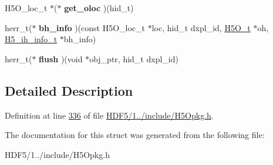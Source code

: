 \begin{DoxyCompactItemize}
\mbox{\label{struct_h5_o__obj__class__t_a9003688d6bd85086846ba1a469f45981}} 
H5\+O\+\_\+loc\+\_\+t $\ast$($\ast$ {\bfseries get\+\_\+oloc} )(hid\+\_\+t)
\item 
\mbox{\label{struct_h5_o__obj__class__t_a7deca9359b5540c8de4cc66cf4ea6350}} 
herr\+\_\+t($\ast$ {\bfseries bh\+\_\+info} )(const H5\+O\+\_\+loc\+\_\+t $\ast$loc, hid\+\_\+t dxpl\+\_\+id, \hyperlink{struct_h5_o__t}{H5\+O\+\_\+t} $\ast$oh, \hyperlink{struct_h5__ih__info__t}{H5\+\_\+ih\+\_\+info\+\_\+t} $\ast$bh\+\_\+info)
\item 
\mbox{\label{struct_h5_o__obj__class__t_af05ff60e0aec800c4a545b642e04c31a}} 
herr\+\_\+t($\ast$ {\bfseries flush} )(void $\ast$obj\+\_\+ptr, hid\+\_\+t dxpl\+\_\+id)
\end{DoxyCompactItemize}


\subsection{Detailed Description}


Definition at line \hyperlink{_h_d_f5_21_810_81_2include_2_h5_opkg_8h_source_l00336}{336} of file \hyperlink{_h_d_f5_21_810_81_2include_2_h5_opkg_8h_source}{H\+D\+F5/1../include/\+H5\+Opkg.\+h}.



The documentation for this struct was generated from the following file\+:\begin{DoxyCompactItemize}
\item 
H\+D\+F5/1../include/\+H5\+Opkg.\+h\end{DoxyCompactItemize}
